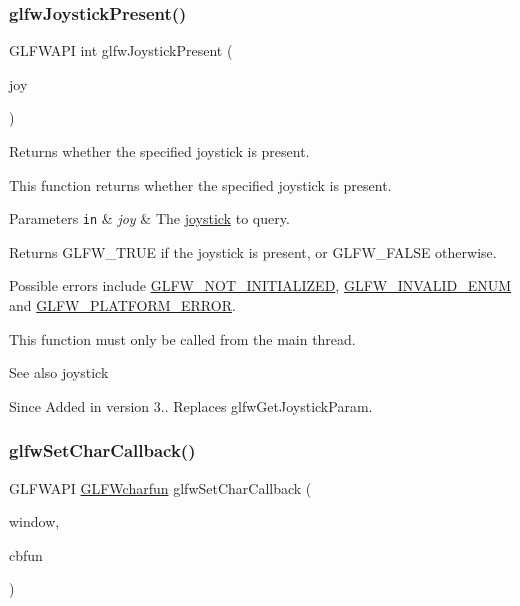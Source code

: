 \subsubsection{\texorpdfstring{glfw\+Joystick\+Present()}{glfwJoystickPresent()}}
{\footnotesize\ttfamily G\+L\+F\+W\+A\+PI int glfw\+Joystick\+Present (\begin{DoxyParamCaption}\item[{int}]{joy }\end{DoxyParamCaption})}



Returns whether the specified joystick is present. 

This function returns whether the specified joystick is present.


\begin{DoxyParams}[1]{Parameters}
\mbox{\tt in}  & {\em joy} & The \hyperlink{group__joysticks}{joystick} to query. \\
\hline
\end{DoxyParams}
\begin{DoxyReturn}{Returns}
{\ttfamily G\+L\+F\+W\+\_\+\+T\+R\+UE} if the joystick is present, or {\ttfamily G\+L\+F\+W\+\_\+\+F\+A\+L\+SE} otherwise.
\end{DoxyReturn}
Possible errors include \hyperlink{group__errors_ga2374ee02c177f12e1fa76ff3ed15e14a}{G\+L\+F\+W\+\_\+\+N\+O\+T\+\_\+\+I\+N\+I\+T\+I\+A\+L\+I\+Z\+ED}, \hyperlink{group__errors_ga76f6bb9c4eea73db675f096b404593ce}{G\+L\+F\+W\+\_\+\+I\+N\+V\+A\+L\+I\+D\+\_\+\+E\+N\+UM} and \hyperlink{group__errors_gad44162d78100ea5e87cdd38426b8c7a1}{G\+L\+F\+W\+\_\+\+P\+L\+A\+T\+F\+O\+R\+M\+\_\+\+E\+R\+R\+OR}.

This function must only be called from the main thread.

\begin{DoxySeeAlso}{See also}
joystick
\end{DoxySeeAlso}
\begin{DoxySince}{Since}
Added in version 3.. Replaces {\ttfamily glfw\+Get\+Joystick\+Param}. 
\end{DoxySince}
\mbox{\label{group__input_ga07b2959b23dc3e466ce7475746021002}} 
\subsubsection{\texorpdfstring{glfw\+Set\+Char\+Callback()}{glfwSetCharCallback()}}
{\footnotesize\ttfamily G\+L\+F\+W\+A\+PI \hyperlink{group__input_gabf24451c7ceb1952bc02b17a0d5c3e5f}{G\+L\+F\+Wcharfun} glfw\+Set\+Char\+Callback (\begin{DoxyParamCaption}\item[{\hyperlink{group__window_ga3c96d80d363e67d13a41b5d1821f3242}{G\+L\+F\+Wwindow} $\ast$}]{window,  }\item[{\hyperlink{group__input_gabf24451c7ceb1952bc02b17a0d5c3e5f}{G\+L\+F\+Wcharfun}}]{cbfun }\end{DoxyParamCaption})}



